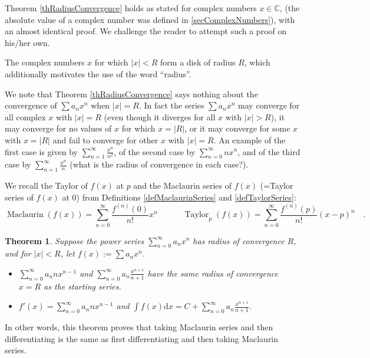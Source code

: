 \documentclass[12pt]{book}
\newcommand{\diff}{\text{d}}
\newtheorem{theorem}{Theorem}[section]
\DeclareMathOperator{\maclaurin}{Maclaurin}
\DeclareMathOperator{\taylor}{Taylor}
\begin{document}
Theorem \ref{thRadiusConvergence} holds as stated for complex numbers $x\in \mathbb C$, (the absolute value of a complex number was defined in \ref{secComplexNumbers}), with an almost identical proof. We challenge the reader to attempt such a proof on his/her own.

The complex numbers $x$ for which $|x|<R$ form a disk of radius $R$, which additionally motivates the use of the word ``radius''.  

We note that Theorem \ref{thRadiusConvergence} says nothing about the convergence of $\sum a_n x^n$ when $|x|=R$. In fact the series $\sum a_n x^n$ may converge for all complex $x$ with $|x|=R$ (even though it diverges for all $x$ with $|x|>R$), it may converge for no values of $x$ for which $x=|R|$, or it may converge for some $x$ with $x=|R|$ and fail to converge for other $x$ with $|x|=R$. An example of the first case is given by $\sum\limits_{n=1}^\infty  \frac{x^n}{n^2}$, of the second case by  $\sum\limits_{n=0}^\infty  nx^n$, and of the third case by $\sum\limits_{n=1}^\infty  \frac{x^n}{n} $ (what is the radius of convergence in each case?).

We recall the Taylor of $f(x)$ at $p$ and the Maclaurin series of $f(x)$ (=Taylor series of $f(x)$ at 0) from Definitions \ref{defMaclaurinSeries} and \ref{defTaylorSeries}:
\[
\maclaurin (f(x))= \sum\limits _{n=0}^\infty \frac{f^{(n)}(0)}{n!}x^n\quad\quad\quad \taylor_p(f(x))=\sum\limits_{n=0}^\infty \frac{f^{(n)}(p)}{n!}(x-p)^n\quad .
\]

\begin{theorem}\label{thDifferentiatingIntegratingPowerSeriesNonFormal}
Suppose the power series $\sum\limits_{n=0}^\infty a_n x^n$ has radius of convergence $R$, and for $|x|<R$, let $f(x):=\sum a_n x^n$. 
\begin{itemize}
\item[(a)] $\sum\limits_{n=0}^\infty a_n n x^{n-1}$ and $\sum\limits_{n=0}^\infty a_n\frac{x^{n+1}}{n+1}$ have the same radius of convergence $x=R$ as the starting series.
\item[(b)] $f'(x)=\sum\limits_{n=0}^\infty a_n n x^{n-1}$ and $\displaystyle\int f(x)\diff x= C+\sum\limits_{n=0}^\infty a_n\frac{x^{n+1}}{n+1} $.
\end{itemize}
\end{theorem}
In other words, this theorem proves that taking Maclaurin series and then differentiating is the same as first differentiating and then taking Maclaurin series.
\end{document}
